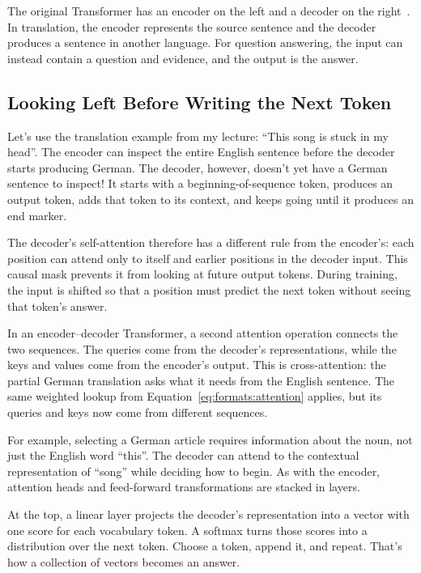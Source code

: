 The original Transformer has an encoder on the left and a decoder on the right~\citep{vaswani-17}.  In translation, the encoder represents the source sentence and the decoder produces a sentence in another language.  For question answering, the input can instead contain a question and evidence, and the output is the answer.

\subsection{Looking Left Before Writing the Next Token}

Let's use the translation example from my lecture: ``This song is stuck in my head''.  The encoder can inspect the entire English sentence before the decoder starts producing German.  The decoder, however, doesn't yet have a German sentence to inspect!  It starts with a beginning-of-sequence token, produces an output token, adds that token to its context, and keeps going until it produces an end marker.

The decoder's self-attention therefore has a different rule from the encoder's: each position can attend only to itself and earlier positions in the decoder input.  This causal mask prevents it from looking at future output tokens.  During training, the input is shifted so that a position must predict the next token without seeing that token's answer.

In an encoder--decoder Transformer, a second attention operation connects the two sequences.  The queries come from the decoder's representations, while the keys and values come from the encoder's output.  This is cross-attention: the partial German translation asks what it needs from the English sentence.  The same weighted lookup from Equation~\ref{eq:formats:attention} applies, but its queries and keys now come from different sequences.

For example, selecting a German article requires information about the noun, not just the English word ``this''.  The decoder can attend to the contextual representation of ``song'' while deciding how to begin.  As with the encoder, attention heads and feed-forward transformations are stacked in layers.

At the top, a linear layer projects the decoder's representation into a vector with one score for each vocabulary token.  A softmax turns those scores into a distribution over the next token.  Choose a token, append it, and repeat.  That's how a collection of vectors becomes an answer.

